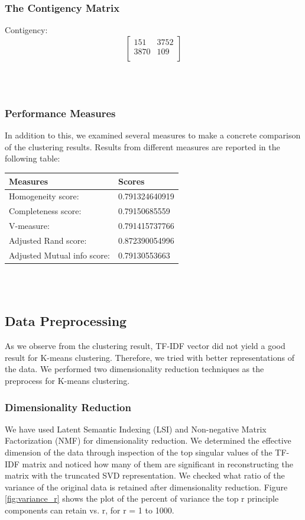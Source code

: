 \documentclass{report}
\begin{document}
\subsubsection*{The Contigency Matrix}
Contigency: \[
\begin{bmatrix}
    151       & 3752\\
    3870       & 109\\
\end{bmatrix}
\]    

\\ \\

\subsubsection*{Performance Measures}
In addition to this, we examined several measures to make a concrete comparison of the clustering results. Results from different measures are reported in the following table: 

\begin{center}
\begin{tabu}{ | X[l] | X[r] | }
\hline
\textbf{Measures} & \textbf{Scores}  \\
\hline
Homogeneity score: & 0.791324640919  \\
\hline
Completeness score: & 0.79150685559   \\
\hline
V-measure: & 0.791415737766   \\
\hline
Adjusted Rand score: & 0.872390054996   \\
\hline
Adjusted Mutual info score: & 0.79130553663  \\
\hline   
\end{tabu}
\end{center}

\\ \\


\subsection*{Data Preprocessing}
As we observe from the clustering result, TF\--IDF vector did not yield a good result for K-means clustering. Therefore, we tried with better representations of the data. We performed two dimensionality reduction techniques as the preprocess for K-means clustering. 

\subsubsection{Dimensionality Reduction}
We have used Latent Semantic Indexing (LSI) and Non-negative Matrix Factorization (NMF) for dimensionality reduction. 
We determined the effective dimension of the data through inspection of the top singular values of the TF\--IDF matrix and noticed how many of them are significant in reconstructing the matrix with the truncated SVD representation. We checked what ratio of the variance of the original data is retained after dimensionality reduction. Figure \ref{fig:variance_r} shows the plot of the percent of variance the top r principle components can retain vs. r, for r = 1 to 1000.
\end{document}
